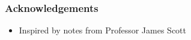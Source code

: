 
\begin{frame}
  \frametitle{Acknowledgements}

  \begin{itemize}
  \item Inspired by notes from Professor James Scott
  \end{itemize}
  
\end{frame}

